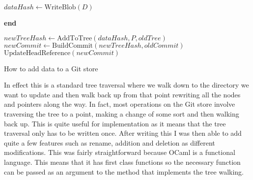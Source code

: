 \begin{algorithm}[h]
\SetAlgoLined
\DontPrintSemicolon



\BlankLine
{}
$ dataHash \leftarrow \textrm{WriteBlob}(D) $\;

\BlankLine
{}
\textbf{end}

\BlankLine
{}
$ newTreeHash \leftarrow \textrm{AddToTree}(dataHash, P, oldTree) $\;
$ newCommit \leftarrow \textrm{BuildCommit}(newTreeHash, oldCommit) $\;
$ \textrm{UpdateHeadReference}(newCommit) $\;
\caption{How to add data to a Git store}
\label{algorithm:addtostore}
\end{algorithm}
\medskip

In effect this is a standard tree traversal where we walk down to the directory we want to update and then walk back up from that point rewriting all the nodes and pointers along the way. In fact, most operations on the Git store involve traversing the tree to a point, making a change of some sort and then walking back up. This is quite useful for implementation as it means that the tree traversal only has to be written once. After writing this I was then able to add quite a few features such as rename, addition and deletion as different modifications. This was fairly straightforward because OCaml is a functional language. This means that it has first class functions so the necessary function can be passed as an argument to the method that implements the tree walking.

